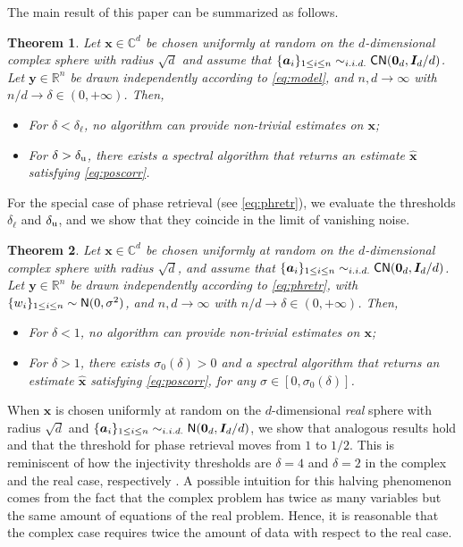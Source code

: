 \documentclass[final,12pt]{colt2018}
\newtheorem*{theorem*}{Theorem}
\def\ba{{\boldsymbol a}}
\def\bx{{\boldsymbol x}}
\def\by{{\boldsymbol y}}
\def\b0{{\boldsymbol 0}}
\def\normal{{\sf N}}
\def\cnormal{{\sf CN}}
\def\id{{\boldsymbol I}}
\begin{document}
The main result of this paper can be summarized as follows.


\begin{theorem*} 
Let $\bx\in \mathbb C^d$ be chosen uniformly at random on the $d$-dimensional complex sphere with radius $\sqrt{d}$ and assume that $\{\ba_i\}_{1\le i\le n}\sim_{i.i.d.}\cnormal(\b0_d,\id_d/d)$.
Let $\by\in \mathbb R^n$ be drawn independently according to \eqref{eq:model}, and $n, d\to \infty$ with $n/d\to \delta \in (0, +\infty)$. Then,
\begin{itemize}
\item For $\delta <\delta_\ell$, no algorithm can provide non-trivial estimates on $\bx$;

\item For $\delta > \delta_{\rm u}$, there exists a spectral algorithm that returns an estimate $\hat{\bx}$ satisfying \eqref{eq:poscorr}. 
\end{itemize}
\end{theorem*}

For the special case of phase retrieval (see \eqref{eq:phretr}), we evaluate the thresholds $\delta_\ell$ and $\delta_{\rm u}$, and we show that they coincide
in the limit of vanishing noise.

%
\begin{theorem*} 
Let $\bx\in \mathbb C^d$ be chosen uniformly at random on the $d$-dimensional complex sphere with radius $\sqrt{d}$, and assume that $\{\ba_i\}_{1\le i\le n}\sim_{i.i.d.}\cnormal(\b0_d,\id_d/d)$.
Let $\by\in \mathbb R^n$ be drawn independently according to \eqref{eq:phretr}, with $\{w_i\}_{1\le i\le n}\sim\normal(0,\sigma^2)$, and $n, d\to \infty$ with $n/d\to \delta \in (0, +\infty)$. Then,
\begin{itemize}
\item For $\delta <1$, no algorithm can provide non-trivial estimates on $\bx$;

\item For $\delta > 1$, there exists $\sigma_0(\delta)>0$ and  a spectral algorithm that returns an estimate $\hat{\bx}$ satisfying \eqref{eq:poscorr}, for any $\sigma\in [0,\sigma_0(\delta)]$. 
\end{itemize}
\end{theorem*}
%
When $\bx$ is chosen uniformly at random on the $d$-dimensional \emph{real} sphere with radius $\sqrt{d}$ and $\{\ba_i\}_{1\le i\le n}\sim_{i.i.d.}\normal(\b0_d,\id_d/d)$, we show that analogous results hold and that the threshold for phase retrieval moves from $1$ to $1/2$. This is reminiscent of how the injectivity thresholds
are $\delta=4$ and $\delta=2$ in the complex and the real case, respectively \citep{balan2006signal, bandeira2014saving, conca2015algebraic}. A possible intuition for this halving phenomenon comes from the fact that the complex problem has twice as many variables but the same amount of equations of the real problem. Hence, it is reasonable that the complex case requires twice the amount of data with respect to the real case. 
\end{document}
